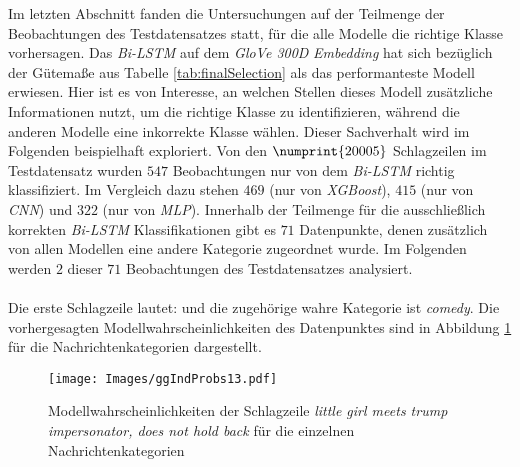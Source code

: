 \documentclass[a4paper,11pt]{article}
\begin{document}
Im letzten Abschnitt fanden die Untersuchungen auf der Teilmenge der Beobachtungen des Testdatensatzes statt, für die alle Modelle die richtige Klasse vorhersagen. Das \textit{Bi-LSTM} auf dem \textit{GloVe 300D} \textit{Embedding} hat sich bezüglich der Gütemaße aus Tabelle \ref{tab:finalSelection} als das performanteste Modell erwiesen. Hier ist es von Interesse, an welchen Stellen dieses Modell zusätzliche Informationen nutzt, um die richtige Klasse zu identifizieren, während die anderen Modelle eine inkorrekte Klasse wählen. Dieser Sachverhalt wird im Folgenden beispielhaft exploriert. Von den $\numprint{20005}$ Schlagzeilen im Testdatensatz wurden $547$ Beobachtungen nur von dem \textit{Bi-LSTM} richtig klassifiziert. Im Vergleich dazu stehen $469$ (nur von \textit{XGBoost}), $415$ (nur von \textit{CNN}) und $322$ (nur von \textit{MLP}). Innerhalb der Teilmenge für die ausschließlich korrekten \textit{Bi-LSTM} Klassifikationen gibt es $71$ Datenpunkte, denen zusätzlich von allen Modellen eine andere Kategorie zugeordnet wurde. Im Folgenden werden $2$ dieser $71$ Beobachtungen des Testdatensatzes analysiert. \\
\\
Die erste Schlagzeile lautet:  und die zugehörige wahre Kategorie ist \textit{comedy}. Die vorhergesagten Modellwahrscheinlichkeiten des Datenpunktes sind in Abbildung \ref{abb:IndProbs13}  für die Nachrichtenkategorien dargestellt.

\begin{figure}[H]
    \centering
\texttt{[image: Images/ggIndProbs13.pdf]} 
\caption{Modellwahrscheinlichkeiten der Schlagzeile \textit{little girl meets trump impersonator, does not hold back} für die einzelnen Nachrichtenkategorien}
\label{abb:IndProbs13}
\end{figure}
\end{document}
